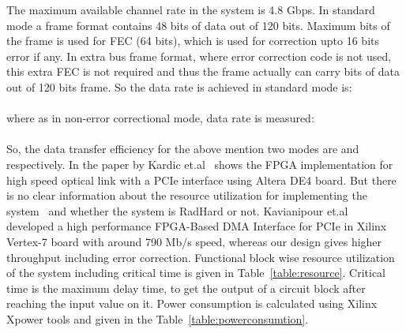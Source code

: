 \documentclass[10pt, conference, compsocconf]{IEEEtran}
\begin{document}
The maximum available channel rate in the system is 4.8 Gbps. In standard mode a frame format contains 48 bits of data out of 120 bits. Maximum bits of the frame is used for FEC (64 bits), which is used for correction upto 16 bits error if any. In extra bus frame format, where error correction code is not used, this extra FEC is not required and thus the frame actually can carry  bits of data out of 120 bits frame.
So the data rate is achieved in standard mode is: \\
 \\
where as in non-error correctional mode, data rate is measured: \\
 \\
So, the data transfer efficiency for the above mention two modes are  and  respectively.
In the paper by Kardic et.al~\cite{Kardic:PCIe:SOCC12} shows the FPGA implementation for high speed optical link with a PCIe interface using Altera DE4 board. But there is no clear information about the resource utilization for implementing the system~\cite{Kardic:PCIe:SOCC12} and whether the system is RadHard or not. Kavianipour et.al~\cite{Kavianipour:IeeeTrans} developed a high performance FPGA-Based DMA Interface for PCIe in Xilinx Vertex-7 board with around 790 Mb/s speed, whereas our design gives higher throughput including error correction. Functional block wise resource utilization of the system including critical time is given in Table~\ref{table:resource}. Critical time is the maximum delay time, to get the output of a circuit block after reaching the input value on it. Power consumption is calculated using Xilinx Xpower tools and given in the Table~\ref{table:powerconsumtion}. 
\end{document}
